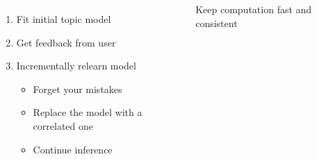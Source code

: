 \documentclass[compress]{beamer}
\begin{document}
{\begin{columns}
\begin{columns}
		\end{columns}


	\begin{enumerate}
		\item Fit initial topic model
			\pause
		\item Get feedback from user
			\pause
		\item Incrementally relearn model
			\begin{itemize}
                                \item Forget your mistakes
				\item Replace the model with a correlated one
				\item Continue inference
			\end{itemize}
	\end{enumerate}
\pause
Keep computation \alert<4>{fast and consistent} \cite{Hu-12a}
	\end{columns}

}
\end{document}
